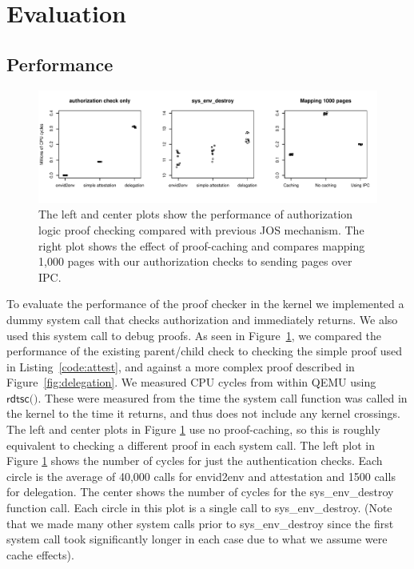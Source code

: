\documentclass[10pt]{article}
\begin{document}
\section{Evaluation}\label{sec:eval}
\subsection{Performance}
\begin{figure}
\includegraphics[width=\textwidth]{plots.pdf}
\caption{The left and center plots show the performance of authorization logic proof checking compared with previous JOS mechanism.  The right plot shows the effect of proof-caching and compares mapping 1,000 pages with our authorization checks to sending pages over IPC.}
\label{fig:perf}
\end{figure}
To evaluate the performance of the proof checker in the kernel we implemented a dummy system call that checks authorization and immediately returns. We also used this system call to debug proofs.  As seen in Figure~\ref{fig:perf}, we compared the performance of the existing parent/child check to checking the simple proof used in Listing~\ref{code:attest}, and against a more complex proof described in Figure~\ref{fig:delegation}.  We measured CPU cycles from within QEMU using $\textsf{rdtsc()}$. These were measured from the time the system call function was called in the kernel to the time it returns, and thus does not include any kernel crossings.  The left and center plots in Figure \ref{fig:perf} use no proof-caching, so this is roughly equivalent to checking a different proof in each system call.  The left plot in Figure \ref{fig:perf} shows the number of cycles for just the authentication checks.  Each circle is the average of 40,000 calls for \textsf{envid2env} and attestation and 1500 calls for delegation.  The center shows the number of cycles for the \textsf{sys\_env\_destroy} function call.  Each circle in this plot is a single call to \textsf{sys\_env\_destroy}. (Note that we made many other system calls prior to \textsf{sys\_env\_destroy} since the first system call took significantly longer in each case due to what we assume were cache effects).
\end{document}
